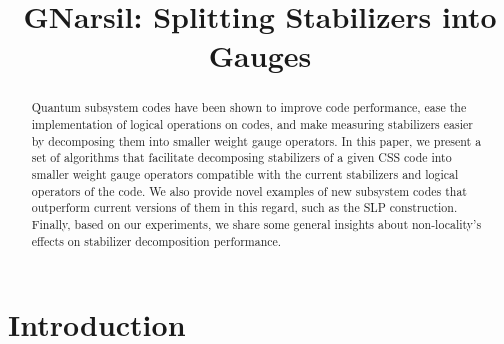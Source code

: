 \documentclass[conference]{IEEEtran}
\begin{document}
\title{GNarsil: Splitting Stabilizers into Gauges}
\makeatletter
\newcommand{\linebreakand}{%
  \end{@IEEEauthorhalign}
  \hfill\mbox{}\par
  \mbox{}\hfill\begin{@IEEEauthorhalign}
}
\makeatother

\author{
  \and
}




\maketitle


\begin{abstract}

Quantum subsystem codes have been shown to improve code performance, ease the implementation of logical operations on codes, and make measuring stabilizers easier by decomposing them into smaller weight gauge operators. In this paper, we present a set of algorithms that facilitate decomposing stabilizers of a given CSS code into smaller weight gauge operators compatible with the current stabilizers and logical operators of the code. We also provide novel examples of new subsystem codes that outperform current versions of them in this regard, such as the SLP construction. Finally, based on our experiments, we share some general insights about non-locality's effects on stabilizer decomposition performance.
\end{abstract}


\section{Introduction}
\end{document}
